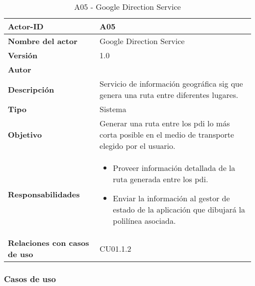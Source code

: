\begin{table}[p]
	\centering
	\begin{tabularx}{\linewidth}{ p{} p{} }
		\toprule
		\textbf{Actor-ID}    & A05 \\
		\toprule
		\textbf{Nombre del actor} & Google Direction Service \\
		\textbf{Versión}              & 1.0    \\
		\textbf{Autor}                & \autor \\
		\textbf{Descripción}          & Servicio de información geográfica \acrfull{sig} que genera una ruta entre diferentes lugares. \\
		\textbf{Tipo}                 & Sistema \\
		\textbf{Objetivo}             & Generar una ruta entre los \acrshort{pdi} lo más corta posible en el medio de transporte elegido por el usuario. \\
		\textbf{Responsabilidades}    & 
		\begin{itemize}
			\tightlist
			\item Proveer información detallada de la ruta generada entre los \acrshort{pdi}.
			\item Enviar la información al gestor de estado de la aplicación que dibujará la polilínea asociada.
		\end{itemize}\\
		\textbf{Relaciones con casos de uso} & CU01.1.2 \\
		\bottomrule
	\end{tabularx}
	\caption{A05 - Google Direction Service}
\end{table}

\subsubsection{Casos de uso}

